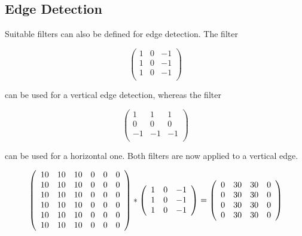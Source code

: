 {	
	\subsection{Edge Detection}
	
	Suitable filters can also be defined for edge detection. The filter
	
	
	$$\left(
	\begin{array}{ccc}
		1 & 0 & -1 \\
		1 & 0 & -1 \\
		1 & 0 & -1 \\
	\end{array}
	\right)
	$$
	
	can be used for a vertical edge detection, whereas the filter 
	
	
	$$\left(
	\begin{array}{ccc}
		1 &  1 &  1 \\
		0 &  0 &  0 \\
		-1 & -1 & -1 \\
	\end{array}
	\right)
	$$
	
	can be used for a horizontal one. Both filters are now applied to a vertical edge.
	
	
	\begin{figure}
		$$
		\left(
		\begin{array}{ccc ccc}
			10 & 10 & 10 & 0 & 0 & 0 \\
			10 & 10 & 10 & 0 & 0 & 0 \\
			10 & 10 & 10 & 0 & 0 & 0 \\
			10 & 10 & 10 & 0 & 0 & 0 \\
			10 & 10 & 10 & 0 & 0 & 0 \\
			10 & 10 & 10 & 0 & 0 & 0 \\
		\end{array}
		\right)
		\ast
		\left(
		\begin{array}{ccc}
			1 & 0 & -1 \\
			1 & 0 & -1 \\
			1 & 0 & -1 \\
		\end{array}
		\right)
		=
		\left(
		\begin{array}{cccc}
			0 & 30 & 30 & 0 \\
			0 & 30 & 30 & 0 \\
			0 & 30 & 30 & 0 \\
			0 & 30 & 30 & 0 \\
		\end{array}
		\right)
		$$
		

\end{figure}}
